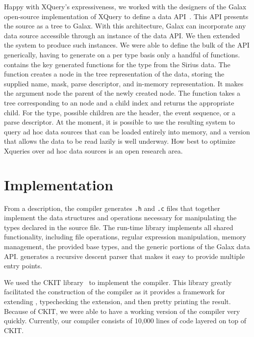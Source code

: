 \documentclass{sig-alternate}
\newcommand{\dibbler}{Sirius}
\begin{document}
Happy with XQuery's expressiveness, we worked with the designers of the Galax~\cite{galax} open-source implementation of XQuery to define a data API~\cite{galaxmanual}. 
This API presents the source as a tree to Galax. With this architecture, Galax can incorporate any data source accessible through an instance of the data API.  We then extended the \pads{} system to produce such instances.  We were able to define the bulk of the API generically, having to generate on a per type basis only a handful of functions. 
 contains the key generated functions for the  type from the \dibbler{} data.    The   function creates a node in the tree representation of the data, storing the supplied name, mask, parse descriptor, and in-memory representation.  It makes the argument node the parent of the newly created node.
The  function takes a tree
corresponding to an  node and a child index and returns the appropriate child.  For the  type, possible children are the header, the event sequence, or a parse descriptor. 
At the moment, it is possible to use the resulting system to query ad hoc data sources that can be loaded entirely into memory, and a version that allows the data to be read lazily is well underway.
How best to optimize Xqueries over ad hoc data sources is an open research area.

\section{Implementation}
From a \pads{} description, the \pads{} compiler generates \texttt{.h} and
\texttt{.c} files that together implement the data structures and operations 
necessary for manipulating the types declared in the source file.  The
\pads{} run-time library implements all shared functionality, including file operations, regular expression manipulation, memory management, the provided base types, and the generic portions of the Galax data API.  \pads{} generates a recursive descent parser that makes it easy to provide multiple entry points.

We used the CKIT library~\cite{ckit} to implement the \pads{} compiler.
This library greatly facilitated the construction of the compiler as it
provides a framework for extending \C{}, typechecking the extension, and then pretty printing the result.  Because of CKIT, we were able to have a working version of the \pads{} compiler very quickly.
Currently, our compiler consists of 10,000 lines of \smlnj{} code layered on top of CKIT.
\end{document}
